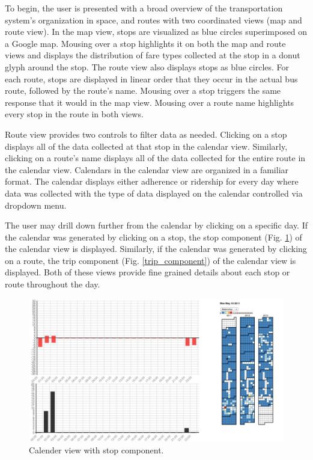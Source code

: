 \documentclass[journal]{vgtc}                %
\begin{document}
To begin, the user is presented with a broad overview of the transportation system's organization in space, and routes with two coordinated views (map and route view). In the map view, stops are visualized as blue circles superimposed on a Google map. Mousing over a stop highlights it on both the map and route views and displays the distribution of fare types collected at the stop in a donut glyph around the stop. The route view also displays stops as blue circles. For each route, stops are displayed in linear order that they occur in the actual bus route, followed by the route's name. Mousing over a stop triggers the same response that it would in the map view. Mousing over a route name highlights every stop in the route in both views.

Route view provides two controls to filter data as needed. Clicking on a stop displays all of the data collected at that stop in the calendar view. Similarly, clicking on a route's name displays all of the data collected for the entire route in the calendar view. Calendars in the calendar view are organized in a familiar format. The calendar displays either adherence or ridership for every day where data was collected with the type of data displayed on the calendar controlled via dropdown menu.

The user may drill down further from the calendar by clicking on a specific day. If the calendar was generated by clicking on a stop, the stop component (Fig. \ref{calendar_view_big}) of the calendar view is displayed. Similarly, if the calendar was generated by clicking on a route, the trip component (Fig. \ref{trip_component}) of the calendar view is displayed. Both of these views provide fine grained details about each stop or route throughout the day.

\begin{figure}[htb]
 \centering
 \includegraphics[width=16cm]{img/image08}
 \caption{Calender view with stop component.}
 \label{calendar_view_big}
\end{figure}
\end{document}
